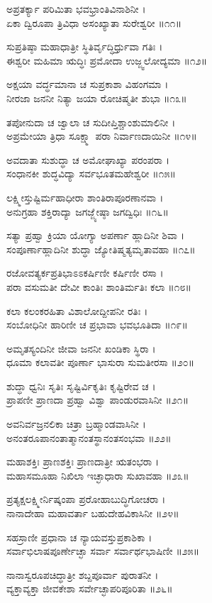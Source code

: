 ಅಪ್ರತರ್ಕ್ಯಾ ಪರಿಮಿತಾ ಭವಭ್ರಾಂತಿವಿನಾಶಿನೀ ।\\
ಏಕಾ ದ್ವಿರೂಪಾ ತ್ರಿವಿಧಾ ಅಸಂಖ್ಯಾತಾ ಸುರೇಶ್ವರೀ ॥೧೧॥

ಸುಪ್ರತಿಷ್ಠಾ ಮಹಾಧಾತ್ರೀ ಸ್ಥಿತಿರ್ವೃದ್ಧಿರ್ಧ್ರುವಾ ಗತಿಃ ।\\
ಈಶ್ವರೀ ಮಹಿಮಾ ಋದ್ಧಿಃ ಪ್ರಮೋದಾ ಉಜ್ಜ್ವಲೋದ್ಯಮಾ ॥೧೨॥

ಅಕ್ಷಯಾ ವರ್ದ್ಧಮಾನಾ ಚ ಸುಪ್ರಕಾಶಾ ವಿಹಂಗಮಾ ।\\
ನೀರಜಾ ಜನನೀ ನಿತ್ಯಾ ಜಯಾ ರೋಚಿಷ್ಮತೀ ಶುಭಾ ॥೧೩॥

ತಪೋನುದಾ ಚ ಜ್ವಾಲಾ ಚ ಸುದೀಪ್ತಿಶ್ಚಾಂಶುಮಾಲಿನೀ ।\\
ಅಪ್ರಮೇಯಾ ತ್ರಿಧಾ ಸೂಕ್ಷ್ಮಾ ಪರಾ ನಿರ್ವಾಣದಾಯಿನೀ ॥೧೪॥

ಅವದಾತಾ ಸುಶುದ್ಧಾ ಚ ಅಮೋಘಾಖ್ಯಾ ಪರಂಪರಾ ।\\
ಸಂಧಾನಕೀ ಶುದ್ಧವಿದ್ಯಾ ಸರ್ವಭೂತಮಹೇಶ್ವರೀ ॥೧೫॥

ಲಕ್ಷ್ಮೀಸ್ತುಷ್ಟಿರ್ಮಹಾಧೀರಾ ಶಾಂತಿರಾಪೂರಣಾನವಾ ।\\
ಅನುಗ್ರಹಾ ಶಕ್ತಿರಾದ್ಯಾ ಜಗಜ್ಜ್ಯೇಷ್ಠಾ ಜಗದ್ವಿಧಿಃ ॥೧೬॥

ಸತ್ಯಾ ಪ್ರಹ್ವಾ ಕ್ರಿಯಾ ಯೋಗ್ಯಾ ಅಪರ್ಣಾ ಹ್ಲಾದಿನೀ ಶಿವಾ ।\\
ಸಂಪೂರ್ಣಾಹ್ಲಾದಿನೀ ಶುದ್ಧಾ ಜ್ಯೋತಿಷ್ಮತ್ಯಮೃತಾವಹಾ ॥೧೭॥

ರಜೋವತ್ಯರ್ಕಪ್ರತಿಭಾಽಽಕರ್ಷಿಣೀ ಕರ್ಷಿಣೀ ರಸಾ ।\\
ಪರಾ ವಸುಮತೀ ದೇವೀ ಕಾಂತಿಃ ಶಾಂತಿರ್ಮತಿಃ ಕಲಾ ॥೧೮॥

ಕಲಾ ಕಲಂಕರಹಿತಾ ವಿಶಾಲೋದ್ದೀಪನೀ ರತಿಃ ।\\
ಸಂಬೋಧಿನೀ ಹಾರಿಣೀ ಚ ಪ್ರಭಾವಾ ಭವಭೂತಿದಾ ॥೧೯॥

ಅಮೃತಸ್ಯಂದಿನೀ ಜೀವಾ ಜನನೀ ಖಂಡಿಕಾ ಸ್ಥಿರಾ ।\\
ಧೂಮಾ ಕಲಾವತೀ ಪೂರ್ಣಾ ಭಾಸುರಾ ಸುಮತೀರಸಾ ॥೨೦॥

ಶುದ್ಧಾ ಧ್ವನಿಃ ಸೃತಿಃ ಸೃಷ್ಟಿರ್ವಿಕೃತಿಃ ಕೃಷ್ಟಿರೇವ ಚ ।\\
ಪ್ರಾಪಣೀ ಪ್ರಾಣದಾ ಪ್ರಹ್ವಾ ವಿಶ್ವಾ ಪಾಂಡುರವಾಸಿನೀ ॥೨೧॥

ಅವನಿರ್ವಜ್ರನಲಿಕಾ ಚಿತ್ರಾ ಬ್ರಹ್ಮಾಂಡವಾಸಿನೀ ।\\
ಅನಂತರೂಪಾನಂತಾತ್ಮಾನಂತಸ್ಥಾನಂತಸಂಭವಾ ॥೨೨॥

ಮಹಾಶಕ್ತಿಃ ಪ್ರಾಣಶಕ್ತಿಃ ಪ್ರಾಣದಾತ್ರೀ ಋತಂಭರಾ ।\\
ಮಹಾಸಮೂಹಾ ನಿಖಿಲಾ ಇಚ್ಛಾಧಾರಾ ಸುಖಾವಹಾ ॥೨೩॥

ಪ್ರತ್ಯಕ್ಷಲಕ್ಷ್ಮೀರ್ನಿಷ್ಕಂಪಾ ಪ್ರರೋಹಾಬುದ್ಧಿಗೋಚರಾ ।\\
ನಾನಾದೇಹಾ ಮಹಾವರ್ತಾ ಬಹುದೇಹವಿಕಾಸಿನೀ ॥೨೪॥

ಸಹಸ್ರಾಣೀ ಪ್ರಧಾನಾ ಚ ನ್ಯಾಯವಸ್ತುಪ್ರಕಾಶಿಕಾ ।\\
ಸರ್ವಾಭಿಲಾಷಪೂರ್ಣೇಚ್ಛಾ ಸರ್ವಾ ಸರ್ವಾರ್ಥಭಾಷಿಣೀ ॥೨೫॥

ನಾನಾಸ್ವರೂಪಚಿದ್ಧಾತ್ರೀ ಶಬ್ದಪೂರ್ವಾ ಪುರಾತನೀ ।\\
ವ್ಯಕ್ತಾವ್ಯಕ್ತಾ ಜೀವಕೇಶಾ ಸರ್ವೇಚ್ಛಾಪರಿಪೂರಿತಾ ॥೨೬॥

